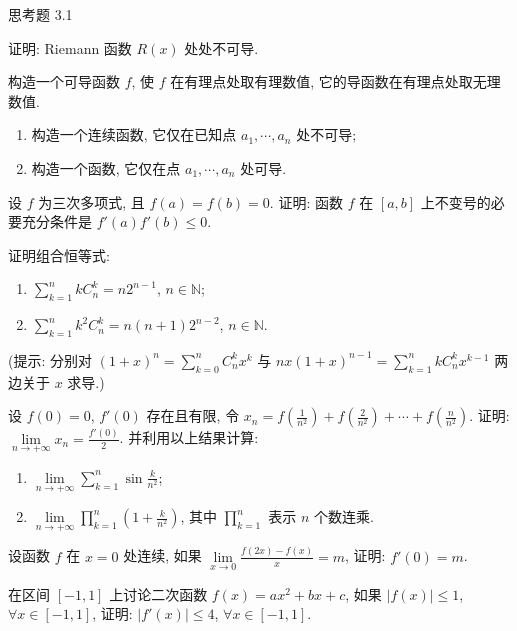 \begin{exblock}{思考题 3.1}
  \item 证明: Riemann 函数 $R(x)$ 处处不可导.

  \item 构造一个可导函数 $f$, 使 $f$ 在有理点处取有理数值, 它的导函数在有理点处取无理数值.

  \item
  \begin{enumerate}[label=(\arabic*)]
    \item 构造一个连续函数, 它仅在已知点 $a_1, \cdots, a_n$ 处不可导;
    \item 构造一个函数, 它仅在点 $a_1, \cdots, a_n$ 处可导.
  \end{enumerate}

  \item 设 $f$ 为三次多项式, 且 $f(a) = f(b) = 0$. 证明: 函数 $f$ 在 $[a,b]$ 上不变号的必要充分条件是 $f'(a)f'(b) \leqslant 0$.

  \item 证明组合恒等式:
  \begin{enumerate}[label=(\arabic*)]
    \item $\sum\limits_{k=1}^{n}kC_n^k = n2^{n-1}$, $n \in \mathbb{N}$;
    \item $\sum\limits_{k=1}^{n}k^2C_n^k = n(n+1)2^{n-2}$, $n \in \mathbb{N}$.
  \end{enumerate}
  (提示: 分别对 $(1+x)^n = \sum\limits_{k=0}^{n}C_n^k x^k$ 与 $nx(1+x)^{n-1} = \sum\limits_{k=1}^{n}kC_n^k x^{k-1}$ 两边关于 $x$ 求导.)

  \item 设 $f(0) = 0$, $f'(0)$ 存在且有限, 令 $x_n = f\left(\frac{1}{n^2}\right) + f\left(\frac{2}{n^2}\right) + \cdots + f\left(\frac{n}{n^2}\right)$. 证明: $\lim\limits_{n\to+\infty}x_n = \frac{f'(0)}{2}$. 并利用以上结果计算:
  \begin{enumerate}[label=(\arabic*)]
    \item $\lim\limits_{n\to+\infty}\sum\limits_{k=1}^{n}\sin\frac{k}{n^2}$;
    \item $\lim\limits_{n\to+\infty}\prod\limits_{k=1}^{n}\left(1 + \frac{k}{n^2}\right)$, 其中 $\prod\limits_{k=1}^{n}$ 表示 $n$ 个数连乘.
  \end{enumerate}

  \item 设函数 $f$ 在 $x=0$ 处连续, 如果 $\lim\limits_{x\to0}\frac{f(2x) - f(x)}{x} = m$, 证明: $f'(0) = m$.

  \item 在区间 $[-1,1]$ 上讨论二次函数 $f(x) = ax^2 + bx + c$, 如果 $|f(x)| \leqslant 1$, $\forall x \in [-1,1]$, 证明: $|f'(x)| \leqslant 4$, $\forall x \in [-1,1]$.


\end{exblock}
